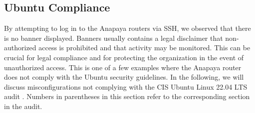 \subsection{Ubuntu Compliance}
By attempting to log in to the Anapaya routers via SSH, we observed that there is no banner displayed.
Banners usually contains a legal disclaimer that non-authorized access is prohibited and that activity may be monitored.
This can be crucial for legal compliance and for protecting the organization in the event of unauthorized access.
This is one of a few examples where the Anapaya router does not comply with the Ubuntu security guidelines.
In the following, we will discuss misconfigurations not complying with the CIS Ubuntu Linux 22.04 LTS audit \cite{cisUbuntuLinux2204LTS}.
Numbers in parentheses in this section refer to the corresponding section in the audit.


